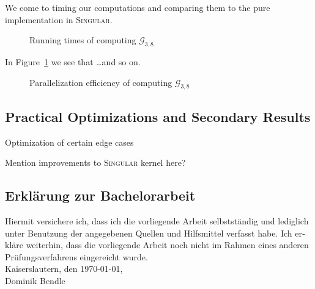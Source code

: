 \documentclass[
  paper=a4,
  titlepage,
  bibliography=totoc,
  listof=totoc,
  pagesize=pdftex
]{scrartcl}
\numberwithin{figure}{section}
\numberwithin{equation}{section}
\numberwithin{table}{section}
\theoremstyle{definition}
\numberwithin{definition}{section}
\begin{document}
We come to timing our computations and comparing them to the pure implementation in
\textsc{Singular}.

\begin{figure}[htbp]
  \begin{center}
    
  \end{center}
  \caption{Running times of computing $\mathcal{G}_{3,8}$}
  \label{fig:g38scaling}
\end{figure}

In Figure~\ref{fig:g38scaling} we see that \dots and so on.

\begin{figure}[htb]
  \begin{center}
    
  \end{center}
  \caption{Parallelization efficiency of computing $\mathcal{G}_{3,8}$}
  \label{fig:g38efficiency}
\end{figure}

\subsection{Practical Optimizations and Secondary Results}

Optimization of certain edge cases

Mention improvements to \textsc{Singular} kernel here?

\newpage
\listoffigures
\newpage%
\printbibliography

\vfill
\begin{otherlanguage}{ngerman}
  \section*{Erklärung zur Bachelorarbeit}
  Hiermit versichere ich, dass ich die vorliegende Arbeit selbstständig und lediglich
  unter Benutzung der angegebenen Quellen und Hilfsmittel verfasst habe. Ich erkläre
  weiterhin, dass die vorliegende Arbeit noch nicht im Rahmen eines anderen
  Prüfungsverfahrens eingereicht wurde.\\[1em]
  Kaiserslautern, den \today,\\[4em]
  Dominik Bendle
\end{otherlanguage}
\end{document}
